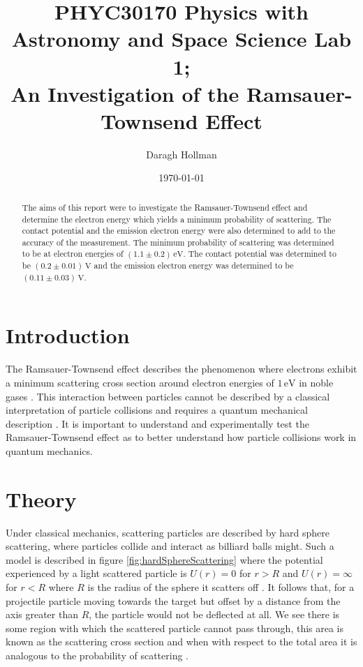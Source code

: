 \documentclass[%
reprint,
amsmath,amssymb,
aps,
floatfix
]{revtex4-2}
\begin{document}
	
	
	\title{PHYC30170 Physics with Astronomy and Space Science Lab 1;\\An Investigation of the Ramsauer-Townsend Effect}
	
	\author{Daragh Hollman}
	
	\date{\today}
	
	\begin{abstract}
	The aims of this report were to investigate the Ramsauer-Townsend effect and determine the electron energy which yields a minimum probability of scattering. The contact potential and the emission electron energy were also determined to add to the accuracy of the measurement. The minimum probability of scattering was determined to be at electron energies of $(1.1 \pm 0.2) \,\text{eV}$. The contact potential was determined to be $(0.2 \pm 0.01) \,\text{V}$ and the emission electron energy was determined to be $(0.11 \pm 0.03) \,\text{V}$.
	\end{abstract}		
	
	\maketitle
	
	\section{Introduction}
	The Ramsauer-Townsend effect describes the phenomenon where electrons exhibit a minimum scattering cross section around electron energies of $1\,\text{eV}$ in noble gases \cite{wisconsin}. This interaction between particles cannot be described by a classical interpretation of particle collisions and requires a quantum mechanical description \cite{texas}. It is important to understand and experimentally test the Ramsauer-Townsend effect as to better understand how particle collisions work in quantum mechanics.
	
	\section{Theory}	
	Under classical mechanics, scattering particles are described by hard sphere scattering, where particles collide and interact as billiard balls might. Such a model is described in figure \ref{fig:hardSphereScattering} where the potential experienced by a light scattered particle is $U(r) = 0$ for $r > R$ and $U(r) = \infty$ for $r < R$ where $R$ is the radius of the sphere it scatters off \cite{santaBarbara}. It follows that, for a projectile particle moving towards the target but offset by a distance from the axis greater than $R$, the particle would not be deflected at all. We see there is some region with which the scattered particle cannot pass through, this area is known as the scattering cross section and when with respect to the total area it is analogous to the probability of scattering \cite{santaBarbara}.\\
	
\end{document}
